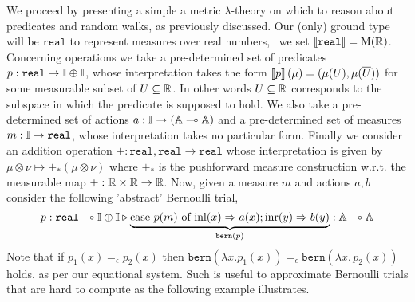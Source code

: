 \documentclass[a4paper,UKenglish,cleveref, autoref, thm-restate]{lipics-v2021}
\begin{document}
We proceed by presenting a simple a metric $\lambda$-theory on which to reason
about predicates and random walks, as previously discussed. Our (only) ground
type will be $\mathtt{real}$ to represent measures over real numbers, \ie\ we
set $\left \llbracket \mathtt{real} \right \rrbracket = \mathrm{M}(\mathbb{R})$.  Concerning operations we take a
pre-determined set of predicates $p : \mathtt{real} \to \mathbb{I} \oplus \mathbb{I}$,
whose interpretation takes the form $\left \llbracket p \right \rrbracket(\mu) = (\mu(U),
\mu(\overline{U}))$ for some measurable subset of $U \subseteq \mathbb{R}$. In
other words $U \subseteq \mathbb{R}$ corresponds to the subspace in which the
predicate is supposed to hold. We also take a pre-determined set of actions $a
: \mathbb{I} \to (\mathbb{A} \multimap \mathbb{A})$ and a pre-determined set of measures $m
: \mathbb{I} \to \mathtt{real}$, whose interpretation takes no particular form.
Finally we consider an addition operation $+ : \mathtt{real},\mathtt{real} \to
\mathtt{real}$ whose interpretation is given by $\mu \otimes \nu \mapsto
+_\ast(\mu \otimes \nu)$ where $+_\ast$ is the pushforward measure construction
w.r.t. the measurable map $+ : \mathbb{R} \times \mathbb{R} \to \mathbb{R}$.  Now, given a
measure $m$ and actions $a,b$ consider the following 'abstract' Bernoulli
trial,
\[
        p : \mathtt{real} \multimap \mathbb{I} \oplus \mathbb{I}
        \triangleright \underbrace{ \text{case } p(m) \text{ of } \mathrm{inl}(x) \Rightarrow a(x) ; 
        \mathrm{inr}(y) \Rightarrow b(y)}_{\mathtt{bern}(p)} : \mathbb{A} \multimap \mathbb{A}
\]
Note that if $p_1(x) =_\epsilon p_2(x)$ then  $\mathtt{bern}(\lambda x. p_1(x))
=_\epsilon \mathtt{bern}(\lambda x. \, p_2(x))$ holds, as per our equational
system. Such is useful to approximate Bernoulli trials that are hard to compute
as the following example illustrates.
\end{document}
